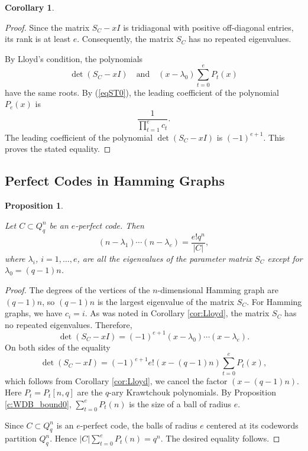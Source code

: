 \documentclass[11pt]{article}
\newtheorem{claim}{Proposition}[section]
\newtheorem{corollary}{Corollary}[section]
\theoremstyle{definition}
\begin{document}
{{{\begin{corollary}
\end{corollary}

\begin{proof}

Since the matrix $S_C-xI$ is tridiagonal with positive
off-diagonal entries, its rank is at least $e$. Consequently, the
matrix $S_C$ has no repeated eigenvalues.

By Lloyd's condition, the polynomials
\[
\det(S_C-xI)
\quad\text{and}\quad
(x-\lambda_0)\sum_{t=0}^eP_t(x)
\]
have the same roots. By (\ref{eqST0}), the leading coefficient of
the polynomial $P_e(x)$ is
\[
\frac{1}{\prod_{t=1}^e c_t}.
\]
The leading coefficient of the polynomial
$\det(S_C-xI)$ is $(-1)^{e+1}$.
This proves the stated equality.

\end{proof}

\subsection{Perfect Codes in Hamming Graphs}\label{15.3}

\begin{claim}\label{cor:Lloydcub}

Let $C\subset Q^n_q$ be an $e$-perfect code.
Then
\[
(n-\lambda_1)\cdots(n-\lambda_e)=\frac{e!q^n}{|C|},
\]
where $\lambda_i$, $i=1,\dots,e$, are all the eigenvalues of the
parameter matrix $S_C$ except for $\lambda_0=(q-1)n$.

\end{claim}

\begin{proof}

The degrees of the vertices of the $n$-dimensional Hamming graph are
$(q-1)n$, so $(q-1)n$ is the largest eigenvalue of the matrix $S_C$.
For Hamming graphs, we have $c_i=i$. As was noted in Corollary
\ref{cor:Lloyd}, the matrix $S_C$ has no repeated eigenvalues.
Therefore,
\[
\det(S_C-xI)=(-1)^{e+1}(x-\lambda_0)\cdots(x-\lambda_e).
\]
On both sides of the equality
\[
\det(S_C-xI)
=
(-1)^{e+1}e!(x-(q-1)n)
\sum_{t=0}^eP_t(x),
\]
which follows from Corollary \ref{cor:Lloyd}, we cancel the factor
$(x-(q-1)n)$. Here $P_t=P_t[n,q]$ are the $q$-ary Krawtchouk
polynomials. By Proposition \ref{c:WDB_bound0},
$
\sum_{t=0}^eP_t(n)$
is the size of a ball of radius $e$.

Since $C\subset Q^n_q$ is an $e$-perfect code, the balls of radius $e$ centered at its codewords partition
$Q^n_q$. Hence
$
|C|\sum_{t=0}^eP_t(n)=q^n$.
The desired equality follows.


\end{proof}}}}
\end{document}
